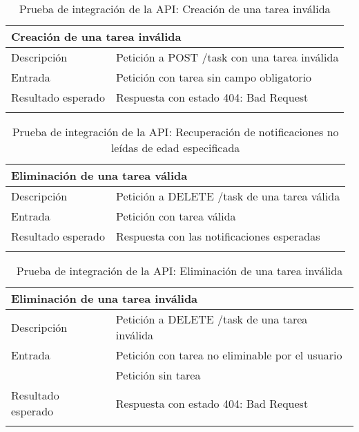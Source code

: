 \vspace{-10pt}
\begin{longtable}{|p{} p{}|}
    \hline
    \multicolumn{2}{|l|}{\textbf{Creación de una tarea inválida}} \\ \hline 
    Descripción                 & Petición a POST /task con una tarea inválida \\ \hline
    Entrada                     & Petición con tarea sin campo obligatorio \\ \hline
    Resultado esperado          & Respuesta con estado 404: Bad Request \\ \hline
    \caption{Prueba de integración de la API: Creación de una tarea inválida}
    \label{cp:i:api:creacion_tarea_invalida}
\end{longtable}

\vspace{-5pt}
\begin{longtable}{|p{} p{}|}
    \hline
    \multicolumn{2}{|l|}{\textbf{Eliminación de una tarea válida}} \\ \hline 
    Descripción                 & Petición a DELETE /task de una tarea válida\\ \hline
    Entrada                     & Petición con tarea válida \\ \hline
    Resultado esperado          & Respuesta con las notificaciones esperadas \\ \hline
    \caption{Prueba de integración de la API: Recuperación de notificaciones no leídas de edad especificada}
    \label{cp:i:api:eliminacion_tarea_valida}
\end{longtable}

\vspace{-5pt}
\begin{longtable}{|p{} p{}|}
    \hline
    \multicolumn{2}{|l|}{\textbf{Eliminación de una tarea inválida}} \\ \hline 
    Descripción                 & Petición a DELETE /task de una tarea inválida \\ \hline
    Entrada                     & Petición con tarea no eliminable por el usuario \\
                                & Petición sin tarea \\ \hline
    Resultado esperado          & Respuesta con estado 404: Bad Request \\ \hline
    \caption{Prueba de integración de la API: Eliminación de una tarea inválida}
    \label{cp:i:api:eliminacion_tarea_invalida}
\end{longtable}

